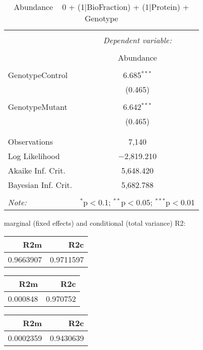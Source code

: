 \documentclass[11pt]{report}
\begin{document}
\begin{table}[!htbp] \centering 
  \caption{Abundance ~ 0 + (1|BioFraction) + (1|Protein) + Genotype} 
  \label{} 
\begin{tabular}{@{\extracolsep{5pt}}lc} 
\\[-1.8ex]\hline 
\hline \\[-1.8ex] 
 & \multicolumn{1}{c}{\textit{Dependent variable:}} \\ 
\cline{2-2} 
\\[-1.8ex] & Abundance \\ 
\hline \\[-1.8ex] 
 GenotypeControl & 6.685$^{***}$ \\ 
  & (0.465) \\ 
  & \\ 
 GenotypeMutant & 6.642$^{***}$ \\ 
  & (0.465) \\ 
  & \\ 
\hline \\[-1.8ex] 
Observations & 7,140 \\ 
Log Likelihood & $-$2,819.210 \\ 
Akaike Inf. Crit. & 5,648.420 \\ 
Bayesian Inf. Crit. & 5,682.788 \\ 
\hline 
\hline \\[-1.8ex] 
\textit{Note:}  & \multicolumn{1}{r}{$^{*}$p$<$0.1; $^{**}$p$<$0.05; $^{***}$p$<$0.01} \\ 
\end{tabular} 
\end{table} 
marginal (fixed effects) and conditional (total variance) R2:

\begin{tabular}{r|r}
\hline
R2m & R2c\\
\hline
0.9663907 & 0.9711597\\
\hline
\end{tabular}

\begin{tabular}{r|r}
\hline
R2m & R2c\\
\hline
0.000848 & 0.970752\\
\hline
\end{tabular}

\begin{tabular}{r|r}
\hline
R2m & R2c\\
\hline
0.0002359 & 0.9430639\\
\hline
\end{tabular}
\end{document}
